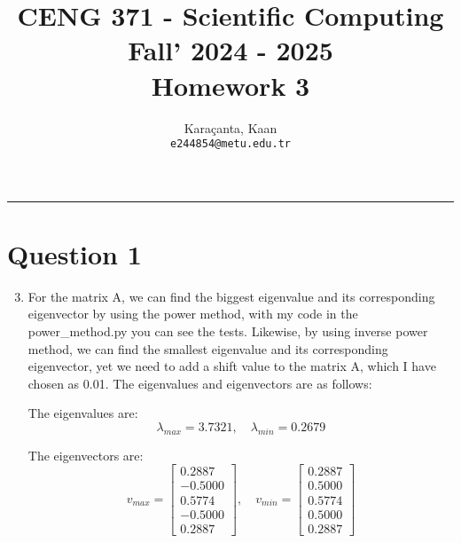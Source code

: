 \documentclass[11pt,a4paper, margin=1in]{article}
\author{
  Karaçanta, Kaan\\
  \texttt{e244854@metu.edu.tr}
}
\title{CENG 371 - Scientific Computing \\
Fall' 2024 - 2025 \\
Homework 3}
\date{}
\begin{document}
\maketitle

\noindent\rule{19cm}{1.2pt}


\section*{Question 1}

\begin{enumerate}
    \setcounter{enumi}{2}
    \item %
    For the matrix A, we can find the biggest eigenvalue and its corresponding eigenvector by using the power method, with my code in the power\_method.py you can see the tests. Likewise, by using inverse power method, we can find the smallest eigenvalue and its corresponding eigenvector, yet we need to add a shift value to the matrix A, which I have chosen as 0.01. The eigenvalues and eigenvectors are as follows:
    
    The eigenvalues are:
    \[
    \lambda_{max} = 3.7321, \quad \lambda_{min} = 0.2679
    \]

    The eigenvectors are:
    \[
    v_{max} = \begin{bmatrix} 0.2887 \\ -0.5000 \\ 0.5774 \\ -0.5000 \\ 0.2887 \end{bmatrix}, \quad v_{min} = \begin{bmatrix} 0.2887 \\ 0.5000 \\ 0.5774 \\ 0.5000 \\ 0.2887 \end{bmatrix}
    \]
    

\end{enumerate}
\end{document}
